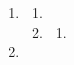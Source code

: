 \documentclass[12pt]{article}
\begin{document}
\begin{enumerate}

    \item \lipsum[1] %
    
    \begin{enumerate}
        \item \lipsum[1] %

        \item \lipsum[1]
        
        \begin{enumerate}
            \item \lipsum[1] %
        \end{enumerate}

    \end{enumerate}
    
    \item \lipsum[1] %
    
\end{enumerate}

\end{document}
